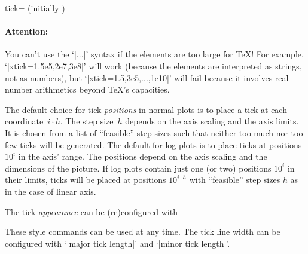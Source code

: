 \begin{pgfplotsxykey}{\x tick= (initially \marg{})%
}
    \paragraph{Attention:}

    You can't use the `|...|' syntax if the elements are too large for \TeX{}!
    For example, `|xtick=1.5e5,2e7,3e8|' will work (because the elements are
    interpreted as strings, not as numbers), but `|xtick=1.5,3e5,...,1e10|'
    will fail because it involves real number arithmetics beyond \TeX's
    capacities.
        \vspace*{0.3cm}

    \noindent The default choice for tick \emph{positions} in normal plots is
    to place a tick at each coordinate~$i\cdot h$. The step size~$h$ depends on
    the axis scaling and the axis limits. It is chosen from a list of
    ``feasible'' step sizes such that neither too much nor too few ticks will
    be generated. The default for log plots is to place ticks at positions
    $10^i$ in the axis' range. The positions depend on the axis scaling and the
    dimensions of the picture. If log plots contain just one (or two) positions
    $10^i$ in their limits, ticks will be placed at positions $10^{i\cdot h}$
    with ``feasible'' step sizes $h$ as in the case of linear axis.

    \noindent The tick \emph{appearance} can be (re)configured with
\begin{codeexample}
\end{codeexample}

    These style commands can be used at any time. The tick line width can be
    configured with `|major tick length|' and `|minor tick length|'.
\begin{codeexample}[]
\end{codeexample}

\begin{codeexample}[]
\end{codeexample}
\end{pgfplotsxykey}

